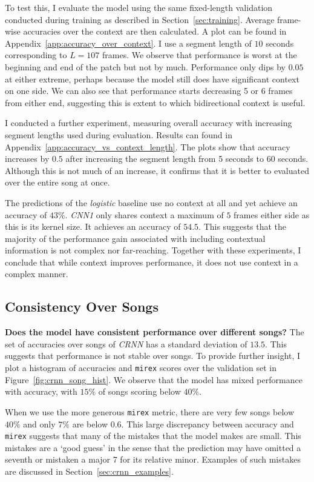 To test this, I evaluate the model using the same fixed-length validation conducted during training as described in Section~\ref{sec:training}. Average frame-wise accuracies over the context are then calculated. A plot can be found in Appendix~\ref{app:accuracy_over_context}. I use a segment length of $10$ seconds corresponding to $L=107$ frames. We observe that performance is worst at the beginning and end of the patch but not by much. Performance only dips by $0.05$ at either extreme, perhaps because the model still does have significant context on one side. We can also see that performance starts decreasing 5 or 6 frames from either end, suggesting this is extent to which bidirectional context is useful.

I conducted a further experiment, measuring overall accuracy with increasing segment lengths used during evaluation. Results can found in Appendix~\ref{app:accuracy_vs_context_length}. The plots show that accuracy increases by $0.5$ after increasing the segment length from 5 seconds to 60 seconds. Although this is not much of an increase, it confirms that it is better to evaluated over the entire song at once.

The predictions of the \emph{logistic} baseline use no context at all and yet achieve an accuracy of $43\%$. \emph{CNN1} only shares context a maximum of $5$ frames either side as this is its kernel size. It achieves an accuracy of $54.5$. This suggests that the majority of the performance gain associated with including contextual information is not complex nor far-reaching. Together with these experiments, I conclude that while context improves performance, it does not use context in a complex manner. 

\subsection{Consistency Over Songs}

\textbf{Does the model have consistent performance over different songs?} The set of accuracies over songs of \emph{CRNN} has a standard deviation of $13.5$. This suggests that performance is not stable over songs. To provide further insight, I plot a histogram of accuracies and \texttt{mirex} scores over the validation set in Figure~\ref{fig:crnn_song_hist}. We observe that the model has mixed performance with accuracy, with $15\%$ of songs scoring below $40\%$.  

When we use the more generous \texttt{mirex} metric, there are very few songs below $40\%$ and only $7\%$ are below $0.6$. This large discrepancy between accuracy and \texttt{mirex} suggests that many of the mistakes that the model makes are small. This mistakes are a `good guess' in the sense that the prediction may have omitted a seventh or mistaken a major 7 for its relative minor. Examples of such mistakes are discussed in Section~\ref{sec:crnn_examples}. 

